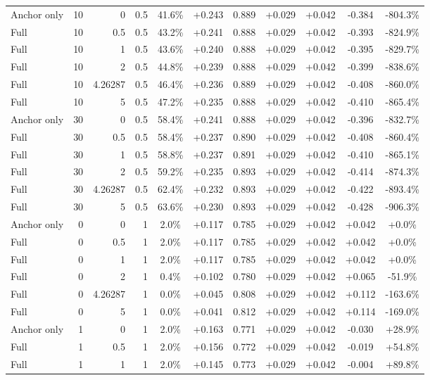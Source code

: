 \begin{table}[htbp]
\begin{tabular}{lrrrccccccc}
Anchor only & 10 & 0 & 0.5 & 41.6\% & +0.243 & 0.889 & +0.029 & +0.042 & -0.384 & -804.3\% \\
Full & 10 & 0.5 & 0.5 & 43.2\% & +0.241 & 0.888 & +0.029 & +0.042 & -0.393 & -824.9\% \\
Full & 10 & 1 & 0.5 & 43.6\% & +0.240 & 0.888 & +0.029 & +0.042 & -0.395 & -829.7\% \\
Full & 10 & 2 & 0.5 & 44.8\% & +0.239 & 0.888 & +0.029 & +0.042 & -0.399 & -838.6\% \\
Full & 10 & 4.26287 & 0.5 & 46.4\% & +0.236 & 0.889 & +0.029 & +0.042 & -0.408 & -860.0\% \\
Full & 10 & 5 & 0.5 & 47.2\% & +0.235 & 0.888 & +0.029 & +0.042 & -0.410 & -865.4\% \\
Anchor only & 30 & 0 & 0.5 & 58.4\% & +0.241 & 0.888 & +0.029 & +0.042 & -0.396 & -832.7\% \\
Full & 30 & 0.5 & 0.5 & 58.4\% & +0.237 & 0.890 & +0.029 & +0.042 & -0.408 & -860.4\% \\
Full & 30 & 1 & 0.5 & 58.8\% & +0.237 & 0.891 & +0.029 & +0.042 & -0.410 & -865.1\% \\
Full & 30 & 2 & 0.5 & 59.2\% & +0.235 & 0.893 & +0.029 & +0.042 & -0.414 & -874.3\% \\
Full & 30 & 4.26287 & 0.5 & 62.4\% & +0.232 & 0.893 & +0.029 & +0.042 & -0.422 & -893.4\% \\
Full & 30 & 5 & 0.5 & 63.6\% & +0.230 & 0.893 & +0.029 & +0.042 & -0.428 & -906.3\% \\
Anchor only & 0 & 0 & 1 & 2.0\% & +0.117 & 0.785 & +0.029 & +0.042 & +0.042 & +0.0\% \\
Full & 0 & 0.5 & 1 & 2.0\% & +0.117 & 0.785 & +0.029 & +0.042 & +0.042 & +0.0\% \\
Full & 0 & 1 & 1 & 2.0\% & +0.117 & 0.785 & +0.029 & +0.042 & +0.042 & +0.0\% \\
Full & 0 & 2 & 1 & 0.4\% & +0.102 & 0.780 & +0.029 & +0.042 & +0.065 & -51.9\% \\
Full & 0 & 4.26287 & 1 & 0.0\% & +0.045 & 0.808 & +0.029 & +0.042 & +0.112 & -163.6\% \\
Full & 0 & 5 & 1 & 0.0\% & +0.041 & 0.812 & +0.029 & +0.042 & +0.114 & -169.0\% \\
Anchor only & 1 & 0 & 1 & 2.0\% & +0.163 & 0.771 & +0.029 & +0.042 & -0.030 & +28.9\% \\
Full & 1 & 0.5 & 1 & 2.0\% & +0.156 & 0.772 & +0.029 & +0.042 & -0.019 & +54.8\% \\
Full & 1 & 1 & 1 & 2.0\% & +0.145 & 0.773 & +0.029 & +0.042 & -0.004 & +89.8\% \\

\end{tabular}
\end{table}
